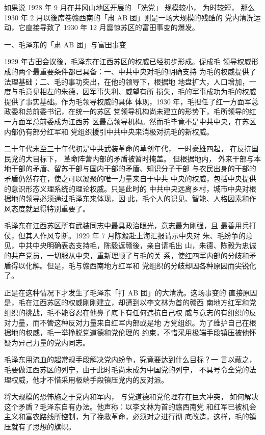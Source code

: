如果说 1928 年 9 月在井冈山地区开展的
「洗党」
规模较小，
为时较短，
那么 1930 年 2 月以後席卷赣西南的「肃 AB 团」则是一场大规模的残酷的
党内清洗运动，它直接导致了 1930 年 12 月震惊苏区的富田事变的爆发。

一、毛泽东的「肃 AB 团」与富田事变

1929 年古田会议後，毛泽东在江西苏区的权威已经初步形成。促成毛
领导权威形成的两个最重要条件都已具备：一、中共中央对毛的明确支持
为毛的权威提供了法理基础；二、毛的事功突出，在他的领导下，根据地
地盘扩大，人口增加，一度与毛意见相左的朱德，因军事失利、威望有所
损失，毛的军事成功为毛的权威提供了事实基础。作为毛领导权威的具体
体现，1930 年，毛担任了红一方面军总政委和总前委书记，在统一的苏区
党领导机构尚未建立的形势下，毛所领导的红一方面军总前委成为江西苏
区最高领导机构。然而毛毕竟不是中共中央，在苏区内部仍有部分红军和
党组织援引中共中央来消极对抗毛的新权威。

二十年代末至三十年代初是中共武装革命的草创年代，
一时豪雄四起，
在反抗国民党的大目标下，
革命阵营内部的矛盾被暂时掩盖。
但根据地内，
外来干部与本地干部的矛盾、留苏干部与国内干部的矛盾、知识分子干部
与农民出身的干部的矛盾仍然存在，使之可以凝聚的唯一力量来自于中共
中央的权威，包括中央提供的意识形态义理系统的理论权威。只是此时的
中共中央远离乡村，城市中央对根据地的领导必须通过毛泽东来体现，因
此，毛个人的识见、智能、人格因素和作风态度就显得特别重要了。

毛泽东在江西苏区所有武装同志中最具政治眼光，意志最为刚强，且
最善用兵打仗，但其人作风专断。1929 年 7 月陈毅赴上海汇报请示中央对
朱、毛纷争的意见，中共中央明确表态支持毛，陈毅返赣後，亲自请毛出
山，朱德、陈毅为忠诚的共产党员，一切服从中央，重新理顺了与毛的关
系，使红四军内部的分歧和矛盾得以化解。但是，毛与赣西南地方红军和
党组织的分歧却因各种原因而尖锐化了。
 
正是在这种情况下才发生了毛泽东「打 AB 团」的大清洗。这场事变的
直接原因是，毛在江西苏区的权威刚刚建立，却遭到以李文林为首的赣西
南地方红军和党组织的挑战，毛不能容忍在他鼻子底下有任何违抗自己权
威与意志的有组织的反对力量，而不管这种反对力量来自红军内部或是地
方党组织。为了维护自己在根据地的权威，毛一举挣脱党道德和党伦理的
约束，不惜采用极端手段镇压被他怀疑为异己力量的党内同志。
 
毛泽东用流血的超常规手段解决党内纷争，究竟要达到什么目标？一
言以蔽之，毛要做江西苏区的列宁，由于此时毛尚未成为中国党的列宁，
不具号令全党的法理权威，他才不惜采用极端手段镇压党内的反对派。
 
将大规模的恐怖施之于党内和军内，
与党道德和党伦理存在巨大冲突，
如何解决这个矛盾？毛泽东自有办法。他声称：以李文林为首的赣西南党
和红军已被机会主义和富农路线所控制，为了挽救革命，必须对之进行彻
底改造，这样，毛的镇压就有了思想的旗帜。
 
